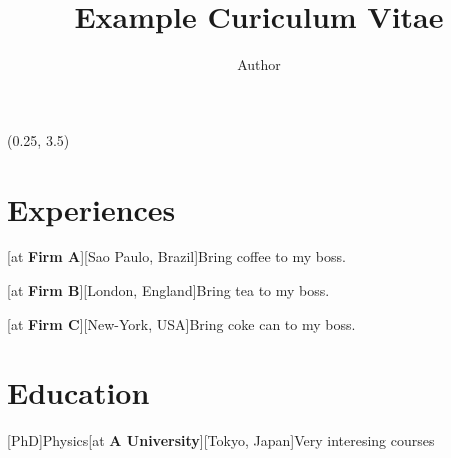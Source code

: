 \documentclass[a4paper]{arthur-cv}
\title{Example Curiculum Vitae}
\author{Author}
\begin{document}
  \makeprofile %

  \begin{textblock}{20.5}(0.25, 3.5)

    \begin{minipage}[t]{0.37\textwidth}










    \end{minipage}\hfill\begin{minipage}[t]{0.61\textwidth}


      \section{Experiences}
        \begin{rightenv}
          [at \textbf{Firm A}][Sao Paulo, Brazil]{Bring coffee to my boss.}

          [at \textbf{Firm B}][London, England]{Bring tea to my boss.}

          [at \textbf{Firm C}][New-York, USA]{Bring coke can to my boss.}
        \end{rightenv}

      \section{Education}
        \begin{rightenv}
          [PhD]{Physics}[at \textbf{A University}][Tokyo, Japan]{Very interesing courses}


\end{rightenv}
\end{minipage}
\end{textblock}
\end{document}
